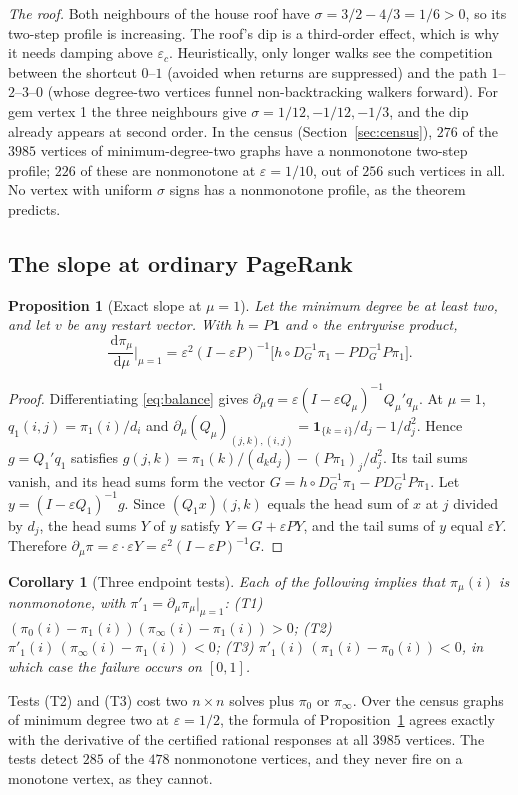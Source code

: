 \documentclass[11pt,a4paper]{article}
\newtheorem{proposition}[theorem]{Proposition}
\newtheorem{corollary}[theorem]{Corollary}
\theoremstyle{definition}\newtheorem{conjecture}{Conjecture}
\theoremstyle{remark}\newtheorem{remark}[theorem]{Remark}
\newcommand{\eps}{\varepsilon}
\newcommand{\dd}{\,\mathrm{d}}
\begin{document}
\emph{The roof.} Both neighbours of the house roof have $\sigma=3/2-4/3=1/6>0$, so its two-step profile is increasing. The roof's dip is a third-order effect, which is why it needs damping above $\eps_c$. Heuristically, only longer walks see the competition between the shortcut $0$--$1$ (avoided when returns are suppressed) and the path $1$--$2$--$3$--$0$ (whose degree-two vertices funnel non-backtracking walkers forward). For gem vertex 1 the three neighbours give $\sigma=1/12,-1/12,-1/3$, and the dip already appears at second order. In the census (Section~\ref{sec:census}), $276$ of the $3985$ vertices of minimum-degree-two graphs have a nonmonotone two-step profile; $226$ of these are nonmonotone at $\eps=1/10$, out of $256$ such vertices in all. No vertex with uniform $\sigma$ signs has a nonmonotone profile, as the theorem predicts.

\subsection{The slope at ordinary PageRank}
\begin{proposition}[Exact slope at $\mu=1$]\label{prop:slope}
Let the minimum degree be at least two, and let $v$ be any restart vector. With $h=P\mathbf 1$ and $\circ$ the entrywise product,
\[
 \frac{\dd\pi_\mu}{\dd\mu}\Big|_{\mu=1}=\eps^2(I-\eps P)^{-1}\big[h\circ D_G^{-1}\pi_1-PD_G^{-1}P\pi_1\big].
\]
\end{proposition}
\begin{proof}
Differentiating \eqref{eq:balance} gives $\partial_\mu q=\eps(I-\eps Q_\mu)^{-1}Q_\mu'q_\mu$. At $\mu=1$, $q_1(i,j)=\pi_1(i)/d_i$ and $\partial_\mu(Q_\mu)_{(j,k),(i,j)}=\mathbf 1_{\{k=i\}}/d_j-1/d_j^2$. Hence $g=Q_1'q_1$ satisfies $g(j,k)=\pi_1(k)/(d_kd_j)-(P\pi_1)_j/d_j^2$. Its tail sums vanish, and its head sums form the vector $G=h\circ D_G^{-1}\pi_1-PD_G^{-1}P\pi_1$. Let $y=(I-\eps Q_1)^{-1}g$. Since $(Q_1x)(j,k)$ equals the head sum of $x$ at $j$ divided by $d_j$, the head sums $Y$ of $y$ satisfy $Y=G+\eps PY$, and the tail sums of $y$ equal $\eps Y$. Therefore $\partial_\mu\pi=\eps\cdot\eps Y=\eps^2(I-\eps P)^{-1}G$.
\end{proof}

\begin{corollary}[Three endpoint tests]\label{cor:tests}
Each of the following implies that $\pi_\mu(i)$ is nonmonotone, with $\pi'_1=\partial_\mu\pi_\mu|_{\mu=1}$:
(T1) $(\pi_0(i)-\pi_1(i))(\pi_\infty(i)-\pi_1(i))>0$;
(T2) $\pi'_1(i)\,(\pi_\infty(i)-\pi_1(i))<0$;
(T3) $\pi'_1(i)\,(\pi_1(i)-\pi_0(i))<0$, in which case the failure occurs on $[0,1]$.
\end{corollary}
Tests (T2) and (T3) cost two $n\times n$ solves plus $\pi_0$ or $\pi_\infty$. Over the census graphs of minimum degree two at $\eps=1/2$, the formula of Proposition~\ref{prop:slope} agrees exactly with the derivative of the certified rational responses at all $3985$ vertices. The tests detect $285$ of the $478$ nonmonotone vertices, and they never fire on a monotone vertex, as they cannot.
\end{document}
